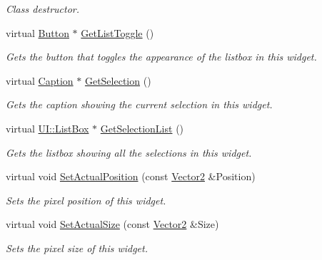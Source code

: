 \begin{DoxyCompactItemize}
\begin{DoxyCompactList}\small\item\em Class destructor. \item\end{DoxyCompactList}\item 
virtual \hyperlink{classMezzanine_1_1UI_1_1Button}{Button} $\ast$ \hyperlink{classMezzanine_1_1UI_1_1DropDownList_a6b8b0d0ba15389eb8a0c9c2b29d6bde4}{GetListToggle} ()
\begin{DoxyCompactList}\small\item\em Gets the button that toggles the appearance of the listbox in this widget. \item\end{DoxyCompactList}\item 
virtual \hyperlink{classMezzanine_1_1UI_1_1Caption}{Caption} $\ast$ \hyperlink{classMezzanine_1_1UI_1_1DropDownList_af70d48bd353cc533e123b0bc7c739632}{GetSelection} ()
\begin{DoxyCompactList}\small\item\em Gets the caption showing the current selection in this widget. \item\end{DoxyCompactList}\item 
virtual \hyperlink{classMezzanine_1_1UI_1_1ListBox}{UI::ListBox} $\ast$ \hyperlink{classMezzanine_1_1UI_1_1DropDownList_a5fe973285b5122fe0b74d0a81e8a26ca}{GetSelectionList} ()
\begin{DoxyCompactList}\small\item\em Gets the listbox showing all the selections in this widget. \item\end{DoxyCompactList}\item 
virtual void \hyperlink{classMezzanine_1_1UI_1_1DropDownList_ab038f951f09d18eaa2dad6c4eff01b7b}{SetActualPosition} (const \hyperlink{classMezzanine_1_1Vector2}{Vector2} \&Position)
\begin{DoxyCompactList}\small\item\em Sets the pixel position of this widget. \item\end{DoxyCompactList}\item 
virtual void \hyperlink{classMezzanine_1_1UI_1_1DropDownList_a83f213b851c8336c064398fe21cea202}{SetActualSize} (const \hyperlink{classMezzanine_1_1Vector2}{Vector2} \&Size)
\begin{DoxyCompactList}\small\item\em Sets the pixel size of this widget. \item\end{DoxyCompactList}\item 

\end{DoxyCompactItemize}
